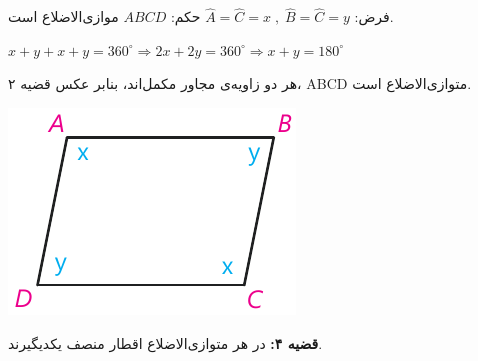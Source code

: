 \documentclass[12pt, a4paper]{book}
\begin{document}
\begin{minipage}{.68\textwidth}
	\centering فرض: 
	$
		\widehat{A} = \widehat{C} = x \; , \; \widehat{B} = \widehat{C} = y
	$
	\qquad حکم:
	$ 
		ABCD 
	$ موازی‌الاضلاع است.
	\begin{flushleft}
		$ 
			x+y +x +y = 360^{\circ} \Rightarrow 2x + 2y = 360^{\circ} \Rightarrow x+y =180^{\circ}
		$
	\end{flushleft}
		هر دو زاویه‌ی مجاور مکمل‌اند،  بنابر عکس قضیه‌ ۲، ABCD متوازی‌الاضلاع است.
\end{minipage}
\begin{minipage}{.28\textwidth}
	\begin{flushleft}
		\includegraphics{"Shapes/Fasl - 3/Dars 1/qazie 3 ax.pdf"}
	\end{flushleft}
\end{minipage}
\newpage

\textbf{قضیه ۴:} در هر متوازی‌الاضلاع اقطار منصف یکدیگیرند.
\end{document}
